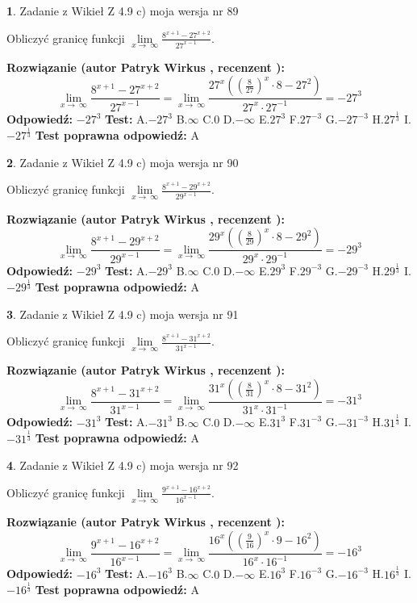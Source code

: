 \documentclass[12pt, a4paper]{article}
\theoremstyle{definition} %
\newtheorem{zad}{}
\newcommand{\zadStart}[1]{\begin{zad}#1\newline}
\newcommand{\zadStop}{\end{zad}}
\newcommand{\rozwStart}[2]{\noindent \textbf{Rozwiązanie (autor #1 , recenzent #2): }\newline}
\newcommand{\rozwStop}{\newline}
\newcommand{\odpStart}{\noindent \textbf{Odpowiedź:}\newline}
\newcommand{\odpStop}{\newline}
\newcommand{\testStart}{\noindent \textbf{Test:}\newline}
\newcommand{\testStop}{\newline}
\newcommand{\kluczStart}{\noindent \textbf{Test poprawna odpowiedź:}\newline}
\newcommand{\kluczStop}{\newline}
\begin{document}
\zadStart{Zadanie z Wikieł Z 4.9 c) moja wersja nr 89}


Obliczyć granicę funkcji  $\lim\limits_{x\to\ \infty}\frac{8^{x+1}-27^{x+2}}{27^{x-1}}$.
\zadStop
\rozwStart{Patryk Wirkus}{}
$$\lim\limits_{x\to\ \infty}\frac{8^{x+1}-27^{x+2}}{27^{x-1}}=\lim\limits_{x\to\ \infty}\frac{27^{x}((\frac{8}{27})^{x}\cdot 8 -27^{2})}{27^{x}\cdot 27^{-1}} = -27^{3}$$
\rozwStop
\odpStart
$-27^{3}$
\odpStop
\testStart
A.$-27^{3}$ B.$\infty$ C.$0$ D.$-\infty$ E.$27^{3}$
F.$27^{-3}$ G.$-27^{-3}$
H.$27^{\frac{1}{3}}$
I.$-27^{\frac{1}{3}}$
\testStop
\kluczStart
A
\kluczStop



\zadStart{Zadanie z Wikieł Z 4.9 c) moja wersja nr 90}


Obliczyć granicę funkcji  $\lim\limits_{x\to\ \infty}\frac{8^{x+1}-29^{x+2}}{29^{x-1}}$.
\zadStop
\rozwStart{Patryk Wirkus}{}
$$\lim\limits_{x\to\ \infty}\frac{8^{x+1}-29^{x+2}}{29^{x-1}}=\lim\limits_{x\to\ \infty}\frac{29^{x}((\frac{8}{29})^{x}\cdot 8 -29^{2})}{29^{x}\cdot 29^{-1}} = -29^{3}$$
\rozwStop
\odpStart
$-29^{3}$
\odpStop
\testStart
A.$-29^{3}$ B.$\infty$ C.$0$ D.$-\infty$ E.$29^{3}$
F.$29^{-3}$ G.$-29^{-3}$
H.$29^{\frac{1}{3}}$
I.$-29^{\frac{1}{3}}$
\testStop
\kluczStart
A
\kluczStop



\zadStart{Zadanie z Wikieł Z 4.9 c) moja wersja nr 91}


Obliczyć granicę funkcji  $\lim\limits_{x\to\ \infty}\frac{8^{x+1}-31^{x+2}}{31^{x-1}}$.
\zadStop
\rozwStart{Patryk Wirkus}{}
$$\lim\limits_{x\to\ \infty}\frac{8^{x+1}-31^{x+2}}{31^{x-1}}=\lim\limits_{x\to\ \infty}\frac{31^{x}((\frac{8}{31})^{x}\cdot 8 -31^{2})}{31^{x}\cdot 31^{-1}} = -31^{3}$$
\rozwStop
\odpStart
$-31^{3}$
\odpStop
\testStart
A.$-31^{3}$ B.$\infty$ C.$0$ D.$-\infty$ E.$31^{3}$
F.$31^{-3}$ G.$-31^{-3}$
H.$31^{\frac{1}{3}}$
I.$-31^{\frac{1}{3}}$
\testStop
\kluczStart
A
\kluczStop



\zadStart{Zadanie z Wikieł Z 4.9 c) moja wersja nr 92}


Obliczyć granicę funkcji  $\lim\limits_{x\to\ \infty}\frac{9^{x+1}-16^{x+2}}{16^{x-1}}$.
\zadStop
\rozwStart{Patryk Wirkus}{}
$$\lim\limits_{x\to\ \infty}\frac{9^{x+1}-16^{x+2}}{16^{x-1}}=\lim\limits_{x\to\ \infty}\frac{16^{x}((\frac{9}{16})^{x}\cdot 9 -16^{2})}{16^{x}\cdot 16^{-1}} = -16^{3}$$
\rozwStop
\odpStart
$-16^{3}$
\odpStop
\testStart
A.$-16^{3}$ B.$\infty$ C.$0$ D.$-\infty$ E.$16^{3}$
F.$16^{-3}$ G.$-16^{-3}$
H.$16^{\frac{1}{3}}$
I.$-16^{\frac{1}{3}}$
\testStop
\kluczStart
A
\kluczStop
\end{document}
